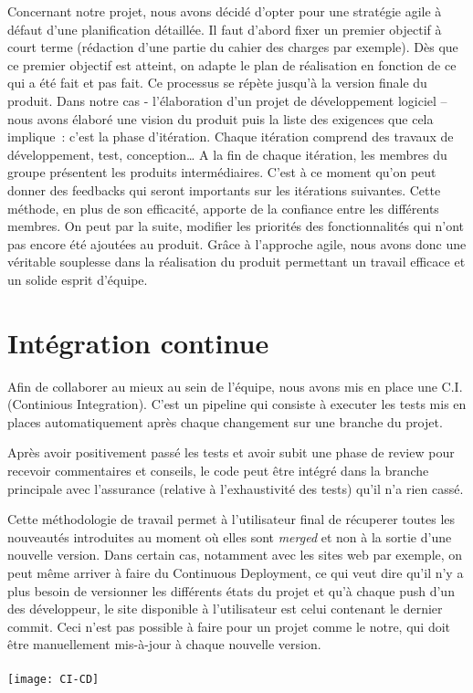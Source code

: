 Concernant notre projet, nous avons décidé d’opter pour une stratégie agile à
défaut d’une planification détaillée. Il faut d’abord fixer un premier objectif
à court terme (rédaction d’une partie du cahier des charges par exemple). Dès
que ce premier objectif est atteint, on adapte le plan de réalisation en
fonction de ce qui a été fait et pas fait. Ce processus se répète jusqu’à la
version finale du produit.
Dans notre cas - l’élaboration d’un projet de développement logiciel – nous
avons élaboré une vision du produit puis la liste des exigences que cela
implique : c’est la phase d’itération. Chaque itération comprend des travaux
de développement, test, conception… A la fin de chaque itération, les membres
du groupe présentent les produits intermédiaires. C’est à ce moment qu’on peut
donner des feedbacks qui seront importants sur les itérations suivantes. Cette
méthode, en plus de son efficacité, apporte de la confiance entre les
différents membres.
On peut par la suite, modifier les priorités des fonctionnalités qui n’ont pas
encore été ajoutées au produit.
Grâce à l’approche agile, nous avons donc une  véritable souplesse dans la
réalisation du produit permettant un travail efficace et un solide esprit
d’équipe.

\section{Intégration continue}
Afin de collaborer au mieux au sein de l'équipe, nous avons mis en place
une C.I. (Continious Integration). C'est un pipeline qui consiste à executer
les tests mis en places automatiquement après chaque changement sur une branche
du projet.

Après avoir positivement passé les tests et avoir subit une phase de review
pour recevoir commentaires et conseils, le code peut être intégré dans la
branche principale avec l'assurance (relative à l’exhaustivité des tests) qu'il
n'a rien cassé.

Cette méthodologie de travail permet à l’utilisateur final de récuperer toutes
les nouveautés introduites au moment où elles sont \emph{merged} et non à la
sortie d’une nouvelle version. Dans certain cas, notamment avec les sites web
par exemple, on peut même arriver à faire du Continuous Deployment, ce qui veut
dire qu’il n’y a plus besoin de versionner les différents états du projet et
qu’à chaque push d’un des développeur, le site disponible à l’utilisateur est
celui contenant le dernier commit. Ceci n'est pas possible à faire pour un
projet comme le notre, qui doit être manuellement mis-à-jour à chaque nouvelle
version.
\\
\\
\texttt{[image: CI-CD]}
